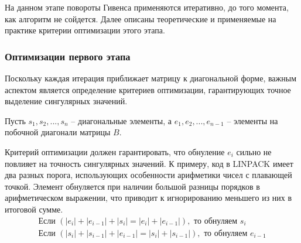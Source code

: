 На данном этапе повороты Гивенса применяются итеративно, до того момента, как алгоритм не сойдется. Далее описаны теоретические и применяемые на практике критерии оптимизации этого этапа.

\subsubsection{Оптимизации первого этапа}

 Поскольку каждая итерация приближает матрицу к диагональной форме, важным аспектом является определение критериев оптимизации, гарантирующих точное выделение сингулярных значений.


Пусть $s_1, s_2,...,s_n$ \--- диагональные элементы, а $e_1, e_2, ..., e_{n-1}$ \--- элементы на побочной диагонали матрицы $B$. 

Критерий оптимизации должен гарантировать, что обнуление $e_i$ сильно не повлияет на точность сингулярных значений. К примеру, код в LINPACK \cite{Dongarra1979} имеет два разных порога, использующих особенности арифметики чисел с плавающей точкой. Элемент обнуляется при наличии большой разницы порядков в арифметическом выражении, что приводит к игнорированию меньшего из них в итоговой сумме.
\begin{align}
\text{Если } (|e_i| + |e_{i-1}| + |s_i| = |e_i| + |e_{i-1}|), \text{ то обнуляем }s_i \label{eq:1:1:1}
\\\text{Если } (|s_i| + |s_{i-1}| + |e_{i-1}| = |s_i| + |s_{i-1}|), \text{ то обнуляем }e_{i-1} \label{eq:1:1:2}
\end{align}

